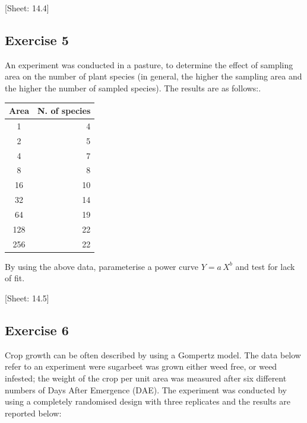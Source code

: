 \documentclass[a4paper,12pt,oneside]{book}
\begin{document}
{[}Sheet: 14.4{]}

\hypertarget{exercise-5-3}{%
\subsection{Exercise 5}\label{exercise-5-3}}

An experiment was conducted in a pasture, to determine the effect of sampling area on the number of plant species (in general, the higher the sampling area and the higher the number of sampled species). The results are as follows:.

\begin{longtable}[]{@{}cr@{}}
\toprule
Area & N. of species \\
\midrule
\endhead
1 & 4 \\
2 & 5 \\
4 & 7 \\
8 & 8 \\
16 & 10 \\
32 & 14 \\
64 & 19 \\
128 & 22 \\
256 & 22 \\
\bottomrule
\end{longtable}

By using the above data, parameterise a power curve \(Y = a \, X^b\) and test for lack of fit.

{[}Sheet: 14.5{]}

\hypertarget{exercise-6-3}{%
\subsection{Exercise 6}\label{exercise-6-3}}

Crop growth can be often described by using a Gompertz model. The data below refer to an experiment were sugarbeet was grown either weed free, or weed infested; the weight of the crop per unit area was measured after six different numbers of Days After Emergence (DAE). The experiment was conducted by using a completely randomised design with three replicates and the results are reported below:
\end{document}
